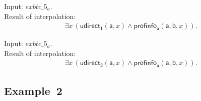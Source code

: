 \documentclass[a4paper]{article}
\newcommand{\pplmacro}[1]{\mathit{#1}}
\begin{document}
\noindent Input: $\pplmacro{exbtc\_5_{a}}.$\\
\noindent Result of interpolation:
\[\begin{array}{lllll}
\exists \mathit{x} \, (\mathsf{udirect_{1}}(\mathsf{a},\mathit{x}) \land  \mathsf{profinfo_{a}}(\mathsf{a},\mathsf{b},\mathit{x})).
\end{array}
\]

\noindent Input: $\pplmacro{exbtc\_5_{a}}.$\\
\noindent Result of interpolation:
\[\begin{array}{lllll}
\exists \mathit{x} \, (\mathsf{udirect_{2}}(\mathsf{a},\mathit{x}) \land  \mathsf{profinfo_{a}}(\mathsf{a},\mathsf{b},\mathit{x})).
\end{array}
\]
%
%
\subsection{Example~2}
\end{document}
